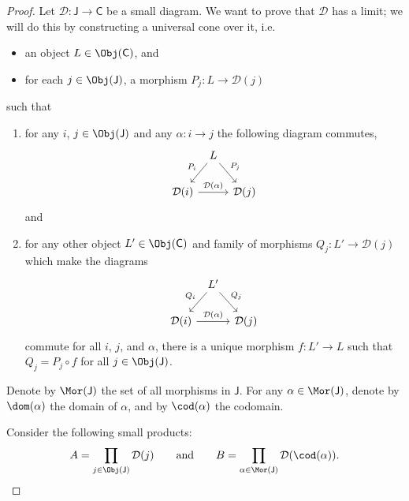 \documentclass[main.tex]{subfiles}
\begin{document}
\begin{proof}
  Let $\mathcal{D}\colon \mathsf{J} \rightarrow \mathsf{C}$ be a small diagram. We want to prove that $\mathcal{D}$ has a limit; we will do this by constructing a universal cone over it, i.e.
  \begin{itemize}
    \item an object $L \in \Obj(\mathsf{C})$, and
    \item for each $j \in \Obj(\mathsf{J})$, a morphism $P_{j}\colon L \to \mathcal{D}(j)$
  \end{itemize}
  such that
  \begin{enumerate}
    \item for any $i$, $j \in \Obj(\mathsf{J})$ and any $\alpha\colon i \to j$ the following diagram commutes,
      \begin{equation*}
        \begin{tikzcd}[column sep=tiny]
          & L
          \arrow[dl, swap, "P_{i}"]
          \arrow[dr, "P_{j}"]
          \\
          \mathcal{D}(i)
          \arrow[rr, "\mathcal{D}(\alpha)"]
          & & \mathcal{D}(j)
        \end{tikzcd}
      \end{equation*}
      and
    \item for any other object $L' \in \Obj(\mathsf{C})$ and family of morphisms $Q_{j}\colon L' \to \mathcal{D}(j)$ which make the diagrams
      \begin{equation*}
        \begin{tikzcd}[column sep=tiny]
          & L'
          \arrow[dl, swap, "Q_{i}"]
          \arrow[dr, "Q_{j}"]
          \\
          \mathcal{D}(i)
          \arrow[rr, "\mathcal{D}(\alpha)"]
          & & \mathcal{D}(j)
        \end{tikzcd}
      \end{equation*}
      commute for all $i$, $j$, and $\alpha$, there is a unique morphism $f\colon L' \to L$ such that $Q_{j} = P_{j} \circ f$ for all $j \in \Obj(\mathsf{J})$.
  \end{enumerate}

  Denote by $\Mor(\mathsf{J})$ the set of all morphisms in $\mathsf{J}$. For any $\alpha \in \Mor(\mathsf{J})$, denote by $\dom(\alpha)$ the domain of $\alpha$, and by $\cod(\alpha)$ the codomain.

  Consider the following small products:
  \begin{equation*}
    A = \prod_{j \in \Obj(\mathsf{J})} \mathcal{D}(j)\qquad\text{and}\qquad B = \prod_{\alpha \in \Mor(\mathsf{J})} \mathcal{D}(\cod(\alpha)).
  \end{equation*}


\end{proof}
\end{document}
